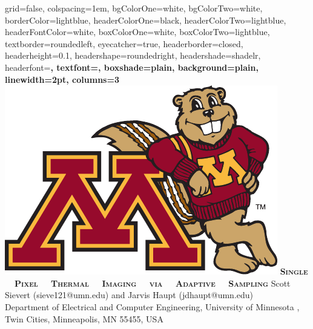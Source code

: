 \documentclass[landscape,final,a0paper,fontscale=0.33]{baposter}
\begin{document}


\newcommand{\SSfontsize}{}
\begin{poster}%
  {
  grid=false,
  colspacing=1em,
  bgColorOne=white,
  bgColorTwo=white,
  borderColor=lightblue,
  headerColorOne=black,
  headerColorTwo=lightblue,
  headerFontColor=white,
  boxColorOne=white,
  boxColorTwo=lightblue,
  textborder=roundedleft,
  eyecatcher=true,
  headerborder=closed,
  headerheight=0.1\textheight,
  headershape=roundedright,
  headershade=shadelr,
  headerfont=\large\bf\textsc, %
  textfont={\setlength{\parindent}{1.5em}},
  boxshade=plain,
  background=plain,
  linewidth=2pt,
  columns=3
  }
  {\includegraphics[scale = 0.5]{logo-eps-converted-to}} 
  {\hspace{1.5em}\huge\bf\textsc{Single \ \ Pixel \ \ Thermal \ \ Imaging \ \ via \ \ Adaptive \ \ Sampling}\vspace{0.2em}}
  {\hspace{2em}Scott Sievert (sieve121@umn.edu) and Jarvis Haupt (jdhaupt@umn.edu) \\ \hspace{2em}\large{Department of Electrical and Computer Engineering, University of Minnesota , Twin Cities, Minneapolis, MN 55455, USA}}

\end{poster}
\end{document}
